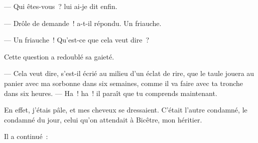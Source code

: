 \documentclass[french,twoside]{book} %
\begin{document}
— Qui êtes-vous ? lui ai-je dit enfin.\par
— Drôle de demande ! a-t-il répondu. Un friauche.\par
— Un friauche ! Qu’est-ce que cela veut dire ?\par
Cette question a redoublé sa gaieté.\par
— Cela veut dire, s’est-il écrié au milieu d’un éclat de rire, que le taule jouera au panier avec ma sorbonne dans six semaines, comme il va faire avec ta tronche dans six heures. — Ha ! ha ! il paraît que tu comprends maintenant.\par
 En effet, j’étais pâle, et mes cheveux se dressaient. C’était l’autre condamné, le condamné du jour, celui qu’on attendait à Bicêtre, mon héritier.\par
Il a continué :\par
\end{document}
